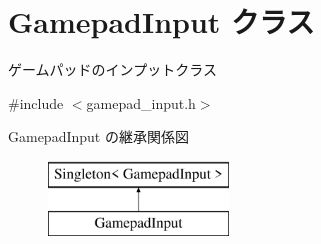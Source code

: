 \hypertarget{class_gamepad_input}{}\section{Gamepad\+Input クラス}
\label{class_gamepad_input}


ゲームパッドのインプットクラス  




{\ttfamily \#include $<$gamepad\+\_\+input.\+h$>$}

Gamepad\+Input の継承関係図\begin{figure}[H]
\begin{center}
\leavevmode
\includegraphics[height=2.000000cm]{class_gamepad_input}
\end{center}
\end{figure}
